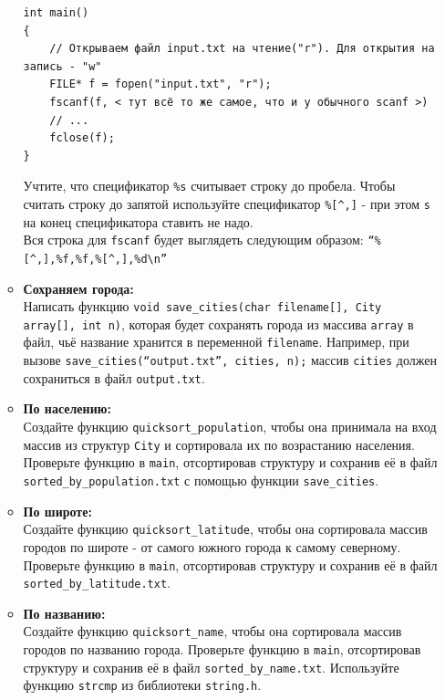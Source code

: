 \documentclass{article}
\begin{document}
\begin{itemize}
\begin{itemize}
\begin{lstlisting}
int main()
{
    // Открываем файл input.txt на чтение("r"). Для открытия на запись - "w"
    FILE* f = fopen("input.txt", "r");
    fscanf(f, < тут всё то же самое, что и у обычного scanf >)
    // ...
    fclose(f);
}
\end{lstlisting}
Учтите, что спецификатор \texttt{\%s} считывает строку до пробела. Чтобы считать строку до запятой используйте спецификатор \texttt{\%[\textasciicircum,]} - при этом \texttt{s} на конец спецификатора ставить не надо.\\
Вся строка для \texttt{fscanf} будет выглядеть следующим образом:
\texttt{``\%[\textasciicircum,],\%f,\%f,\%[\textasciicircum,],\%d\textbackslash n''}

\item \textbf{Сохраняем города:}\\ Написать функцию \texttt{void save\_cities(char filename[], City array[], int n)}, которая будет сохранять города из массива \texttt{array} в файл, чьё название хранится в переменной \texttt{filename}. Например, при вызове \texttt{save\_cities(``output.txt'', cities, n);} массив \texttt{cities} должен сохраниться в файл \texttt{output.txt}.

\item \textbf{По населению:}\\ Создайте функцию \texttt{quicksort\_population}, чтобы она принимала на вход массив из структур \texttt{City} и сортировала их по возрастанию населения. Проверьте функцию в \texttt{main}, отсортировав структуру и сохранив её в файл \texttt{sorted\_by\_population.txt} с помощью функции \texttt{save\_cities}.

\item \textbf{По широте:}\\ Создайте функцию \texttt{quicksort\_latitude}, чтобы она сортировала массив городов по широте - от самого южного города к самому северному. Проверьте функцию в \texttt{main}, отсортировав структуру и сохранив её в файл \texttt{sorted\_by\_latitude.txt}.

\item \textbf{По названию:}\\ Создайте функцию \texttt{quicksort\_name}, чтобы она сортировала массив городов по названию города. Проверьте функцию в \texttt{main}, отсортировав структуру и сохранив её в файл \texttt{sorted\_by\_name.txt}. Используйте функцию \texttt{strcmp} из библиотеки \texttt{string.h}.
\end{itemize}
\end{itemize}
\end{document}
